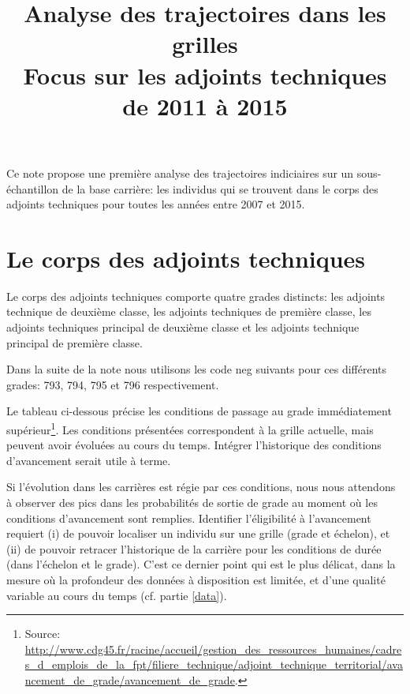 \documentclass[11pt,a4paper]{article}
\begin{document}
\title{Analyse des trajectoires dans les grilles \\ Focus sur les adjoints techniques de 2011 à 2015}


\author{}


\maketitle

Ce note propose une première analyse des trajectoires indiciaires sur un sous-échantillon de la base carrière: les individus qui se trouvent dans le corps des adjoints techniques pour toutes les années entre 2007 et 2015. 

\renewcommand*\contentsname{\textsc{Plan de la note}}
\tableofcontents

\clearpage


\section{Le corps des adjoints techniques}

Le corps des adjoints techniques comporte quatre grades distincts: les adjoints technique de deuxième classe, les adjoints techniques de première classe, les adjoints techniques principal de deuxième classe et les adjoints technique principal de première classe. 

Dans la suite de la note nous utilisons les code neg suivants pour ces différents grades: 793, 794, 795 et 796 respectivement. 

Le tableau ci-dessous précise les conditions de passage au grade immédiatement supérieur\footnote{Source: \url{http://www.cdg45.fr/racine/accueil/gestion_des_ressources_humaines/cadres_d_emplois_de_la_fpt/filiere_technique/adjoint_technique_territorial/avancement_de_grade/avancement_de_grade}.}. Les conditions présentées correspondent à la grille actuelle, mais peuvent avoir évoluées au cours du temps. Intégrer l'historique des conditions d'avancement serait utile à terme. 

Si l'évolution dans les carrières est régie par ces conditions, nous nous attendons à observer des pics dans les probabilités de sortie de grade au moment où les conditions d'avancement sont remplies. Identifier l'éligibilité à l'avancement requiert (i) de pouvoir localiser un individu sur une grille (grade et échelon), et (ii) de pouvoir retracer l'historique de la carrière pour les conditions de durée (dans l'échelon et le grade). C'est ce dernier point qui est le plus délicat, dans la mesure où la profondeur des données à disposition est limitée, et d'une qualité variable au cours du temps (cf. partie \ref{data}). 
\end{document}

